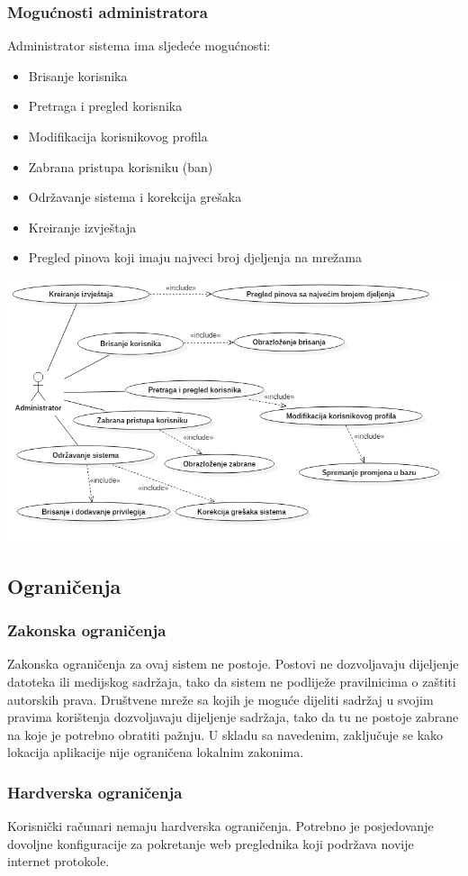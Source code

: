 \subsubsection{Mogućnosti administratora}
Administrator sistema ima sljedeće mogućnosti:
\begin{itemize}
    \item Brisanje korisnika
    \item Pretraga i pregled korisnika
    \item Modifikacija korisnikovog profila
    \item Zabrana pristupa korisniku (ban)
    \item Održavanje sistema i korekcija grešaka
    \item Kreiranje izvještaja
    \item Pregled pinova koji imaju najveci broj djeljenja na mrežama
\end{itemize}
\includegraphics[scale=0.5]{SRS/use_cases/admin.png}
\subsection{Ograničenja}
\subsubsection{Zakonska ograničenja}
Zakonska ograničenja za ovaj sistem ne postoje. Postovi ne dozvoljavaju dijeljenje datoteka ili medijskog sadržaja, tako da sistem ne podliježe pravilnicima o zaštiti autorskih prava. Društvene mreže sa kojih je moguće dijeliti sadržaj u svojim pravima korištenja dozvoljavaju dijeljenje sadržaja, tako da tu ne postoje zabrane na koje je potrebno obratiti pažnju. U skladu sa navedenim, zaključuje se kako lokacija aplikacije nije ograničena lokalnim zakonima.
\subsubsection{Hardverska ograničenja}
Korisnički računari nemaju hardverska ograničenja. Potrebno je posjedovanje dovoljne konfiguracije za pokretanje web preglednika koji podržava novije internet protokole.

